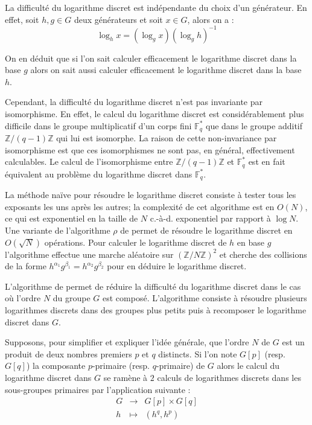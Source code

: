 \documentclass[a4paper,12pt]{article}
\theoremstyle{definition}
\theoremstyle{remark}
\numberwithin{equation}{section}
\begin{document}
La difficulté du logarithme discret est indépendante du choix d'un générateur. En effet, soit $h,g \in G$ deux générateurs et soit $x \in G$, alors on a :
$$\log_h x = (\log_g x)(\log_g h)^{-1}$$

On en déduit que si l'on sait calculer efficacement le logarithme discret dans la base $g$ alors on sait aussi calculer efficacement le logarithme discret dans la base $h$.

Cependant, la difficulté du logarithme discret n'est pas invariante par isomorphisme. En effet, le calcul du logarithme discret est considérablement plus difficile dans le groupe multiplicatif d'un corps fini $\mathbb{F}^*_q$ que dans le groupe additif $\mathbb{Z}/(q-1)\mathbb{Z}$ qui lui est isomorphe. La raison de cette non-invariance par isomorphisme est que ces isomorphismes ne sont pas, en général, effectivement
calculables. Le calcul de l'isomorphisme entre $\mathbb{Z}/(q-1)\mathbb{Z}$ et $\mathbb{F}^*_q$ est en fait équivalent au problème du logarithme discret dans $\mathbb{F}_q^*$.

La méthode naïve pour résoudre le logarithme discret consiste à tester tous les exposants les uns après les autres; la complexité de cet algorithme est en $O(N)$, ce qui est exponentiel en la taille de $N$ c.-à-d. exponentiel par rapport à $\log N$. Une variante de l'algorithme $\rho$ de \citet{pollard} permet de résoudre le logarithme discret en $O(\sqrt{N})$ opérations. Pour calculer le logarithme discret de $h$ en base $g$ l'algorithme effectue une marche aléatoire sur $(\mathbb{Z}/N\mathbb{Z})^2$ et cherche des collisions de la forme $h^{\alpha_1}g^{\beta_1} = h^{\alpha_2}g^{\beta_2}$ pour en déduire le logarithme discret.

L'algorithme de \citet{pohlig-hellman} permet de réduire la difficulté du logarithme discret dans le cas où l'ordre $N$ du groupe $G$ est composé. L'algorithme consiste à résoudre plusieurs logarithmes discrets dans des groupes plus petits puis à recomposer le logarithme discret dans $G$.

Supposons, pour simplifier et expliquer l'idée générale, que l'ordre $N$ de $G$ est un produit de deux nombres premiers $p$ et $q$ distincts. Si l'on note $G[p]$ (resp. $G[q]$) la composante $p$-primaire (resp. $q$-primaire) de $G$ alors le calcul du logarithme discret dans $G$ se ramène à $2$ calculs de logarithmes discrets dans les sous-groupes primaires par l'application suivante :
\begin{equation*}
\begin{array}{lcl}
G & \longrightarrow & G[p] \times G[q] \\
h & \longmapsto & (h^q, h^p)
\end{array}
\end{equation*}
\end{document}
